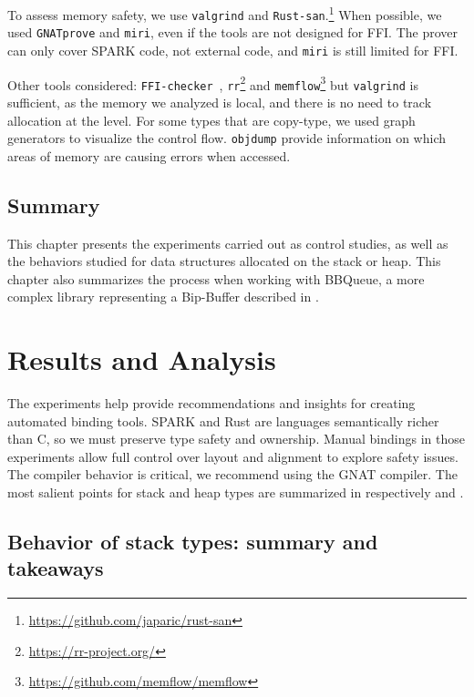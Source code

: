 \documentclass[nomenclature, english, bibtex]{kththesis}
\begin{document}
To assess memory safety, we use \texttt{valgrind} and \texttt{Rust-san}.\footnote{\url{https://github.com/japaric/rust-san}}
When possible, we used \texttt{GNATprove} and \texttt{miri}, even if the tools are not designed for FFI. The prover can only cover SPARK code, not external code, and \texttt{miri} is still limited for FFI.

Other tools considered: \texttt{FFI-checker}~\cite{li_detecting_2022}, \texttt{rr}\footnote{\url{https://rr-project.org/}} and \texttt{memflow}\footnote{\url{https://github.com/memflow/memflow}} but \texttt{valgrind} is sufficient, as the memory we analyzed is local, and there is no need to track allocation at the  level.
For some types that are \gls{copy-type}, we used graph generators to visualize the control flow. \texttt{objdump} provide information on which areas of memory are causing errors when accessed.



\section{Summary}

This chapter presents the experiments carried out as control studies, as well as the behaviors studied for data structures allocated on the stack or heap. This chapter also summarizes the process when working with BBQueue, a more complex library representing a Bip-Buffer described in .

\cleardoublepage
\chapter{Results and Analysis}
\label{ch:resultsAndAnalysis}

The experiments help provide recommendations and insights for creating automated binding tools. SPARK and Rust are languages semantically richer than C, so we must preserve type safety and ownership. Manual bindings in those experiments allow full control over layout and alignment to explore safety issues. The compiler behavior is critical, we recommend using the GNAT compiler. The most salient points for stack and heap types are summarized in respectively  and .

\section{Behavior of stack types: summary and takeaways}
\label{stack-types-behavior}
\end{document}
